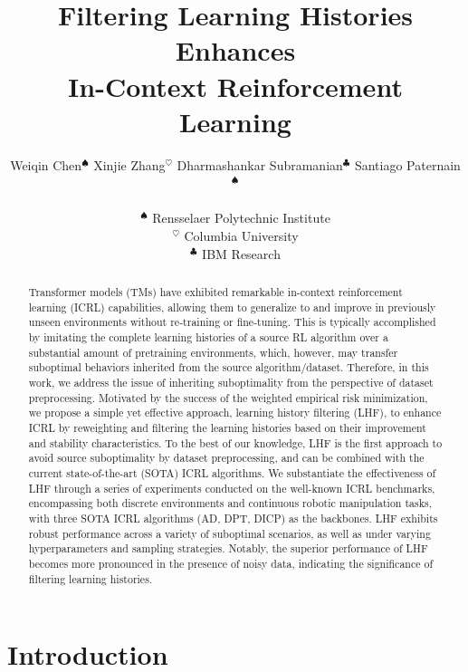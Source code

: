 \documentclass{article}
\title{Filtering Learning Histories Enhances \\ In-Context Reinforcement Learning}
\author{%
  Weiqin Chen$^\spadesuit$ \quad Xinjie Zhang$^\heartsuit
$ \quad Dharmashankar Subramanian$^\clubsuit$ \quad Santiago Paternain$^\spadesuit$  \\ \\
  $^\spadesuit$ Rensselaer Polytechnic Institute \\
  $^\heartsuit$ Columbia University \\
  $^\clubsuit$ IBM Research
}
\begin{document}
\maketitle


\begin{abstract}

Transformer models (TMs) have exhibited remarkable in-context reinforcement learning (ICRL) capabilities, allowing them to generalize to and improve in previously unseen environments without re-training or fine-tuning. This is typically accomplished by imitating the complete learning histories of a source RL algorithm over a substantial amount of pretraining environments, which, however, may transfer suboptimal behaviors inherited from the source algorithm/dataset. Therefore, in this work, we address the issue of inheriting suboptimality from the perspective of dataset preprocessing. Motivated by the success of the weighted empirical risk minimization, we propose a simple yet effective approach, learning history filtering (LHF), to enhance ICRL by reweighting and filtering the learning histories based on their improvement and stability characteristics. To the best of our knowledge, LHF is the first approach to avoid source suboptimality by dataset preprocessing, and can be combined with the current state-of-the-art (SOTA) ICRL algorithms. We substantiate the effectiveness of LHF through a series of experiments conducted on the well-known ICRL benchmarks, encompassing both discrete environments and continuous robotic manipulation tasks, with three SOTA ICRL algorithms (AD, DPT, DICP) as the backbones. LHF exhibits robust performance across a variety of suboptimal scenarios, as well as under varying hyperparameters and sampling strategies. Notably, the superior performance of LHF becomes more pronounced in the presence of noisy data, indicating the significance of filtering learning histories.

\end{abstract}



  




\section{Introduction}
\label{section_introduction}
\end{document}
